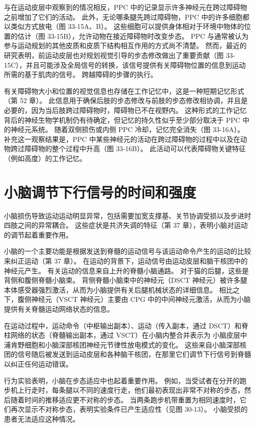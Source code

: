 与在运动皮层中观察到的情况相反，PPC 中的记录显示许多神经元在跨过障碍物之前增加了它们的活动。 此外，无论哪条腿先跨过障碍物，PPC 中的许多细胞都以类似方式放电（图 33-15A、B）。 这些细胞可以提供身体相对于环境中物体的位置的估计（图 33-15B），允许动物在接近障碍物时改变步态。 PPC 与通常被认为参与运动规划的其他皮质和皮质下结构相互作用的方式尚不清楚。 然而，最近的研究表明，前运动皮层也对规划视觉引导的步态修改做出了重要贡献（图 33-15C），并且可能涉及全局信号的转换，该信号提供有关障碍物位置的信息到运动所需的基于肌肉的信号。 跨越障碍的步骤的执行。

有关障碍物大小和位置的视觉信息也存储在工作记忆中，这是一种短期记忆形式（第 52 章）。 此信息用于确保后肢的步态修改与前肢的步态修改相协调，并且是必要的，因为当后肢跨过障碍物时，障碍物已不在视野内。 这种形式的工作记忆背后的神经生物学机制仍有待确定，但记忆的持久性似乎至少部分取决于 PPC 中的神经元系统。 随着双侧损伤或内侧 PPC 冷却，记忆完全消失（图 33-16A）。 补充这一观察结果是，PPC 中某些神经元的活动在跨过障碍物的过程中以及在动物跨过障碍物的整个过程中升高（图 33-16B）。 此活动可以代表障碍物关键特征（例如高度）的工作记忆。


\section{小脑调节下行信号的时间和强度}

小脑损伤导致运动运动明显异常，包括需要加宽支撑基、关节协调受损以及步进时四肢之间的异常耦合。 这些症状是共济失调的特征（第 37 章），表明小脑对运动的调节起着重要作用。

小脑的一个主要功能是根据发送到脊髓的运动信号与该运动命令产生的运动的比较来纠正运动（第 37 章）。 在运动的背景下，运动信号由运动皮层和脑干核团中的神经元产生。 有关运动的信息来自上升的脊髓小脑通路。 对于猫的后腿，这些是背侧和腹侧脊髓小脑束。 背侧脊髓小脑束中的神经元（DSCT 神经元）被许多腿本体感受器强烈激活，从而为小脑提供有关后腿机械状态的详细信息。 相比之下，腹侧神经元（VSCT 神经元）主要由 CPG 中的中间神经元激活，从而为小脑提供有关脊髓运动网络状态的信息。

在运动过程中，运动命令（中枢输出副本）、运动（传入副本，通过 DSCT）和脊柱网络的状态（脊髓输出副本，通过 VSCT）在小脑内整合并表示为 小脑皮层中浦肯野细胞和小脑深部核团神经元节律性放电模式的变化。 这些来自小脑深部核团的信号随后被发送到运动皮层和各种脑干核团，在那里它们调节下行信号到脊髓以纠正任何运动错误。

行为实验表明，小脑在步态适应中也起着重要作用。 例如，当受试者在分开的跑步机上行走时，每条腿以不同的速度行走，他们最初表现出非常不对称的步态，然后随着时间的推移适应更不对称的步态。 当两条跑步机带重置为相同速度时，它们再次显示不对称步态，表明实验条件已产生适应性（见图 30-13）。 小脑受损的患者无法适应这种情况。

